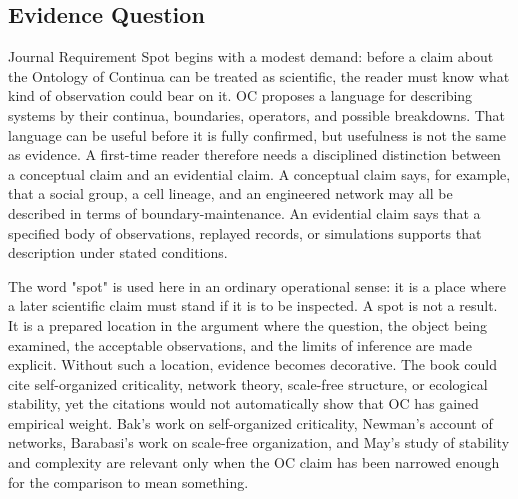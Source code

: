 \documentclass[11pt,a4paper,openany]{book}
\begin{document}
\subsection{Evidence Question}
Journal Requirement Spot begins with a modest demand: before a claim about the Ontology of Continua can be treated as scientific, the reader must know what kind of observation could bear on it. OC proposes a language for describing systems by their continua, boundaries, operators, and possible breakdowns. That language can be useful before it is fully confirmed, but usefulness is not the same as evidence. A first-time reader therefore needs a disciplined distinction between a conceptual claim and an evidential claim. A conceptual claim says, for example, that a social group, a cell lineage, and an engineered network may all be described in terms of boundary-maintenance. An evidential claim says that a specified body of observations, replayed records, or simulations supports that description under stated conditions. \cite{bak_soc,newman_networks}\par
The word "spot" is used here in an ordinary operational sense: it is a place where a later scientific claim must stand if it is to be inspected. A spot is not a result. It is a prepared location in the argument where the question, the object being examined, the acceptable observations, and the limits of inference are made explicit. Without such a location, evidence becomes decorative. The book could cite self-organized criticality, network theory, scale-free structure, or ecological stability, yet the citations would not automatically show that OC has gained empirical weight. Bak's work on self-organized criticality, Newman's account of networks, Barabasi's work on scale-free organization, and May's study of stability and complexity are relevant only when the OC claim has been narrowed enough for the comparison to mean something.\par
\end{document}

